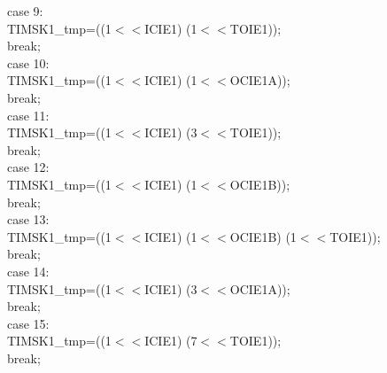 \documentclass[titlepage, a4paper, 10pt, reqno, openany]{report}
\begin{document}
\begin{minipage}[t]{.35\linewidth}
	\hspace*{1cm}		case 9: \\
	\hspace*{1.5cm}			TIMSK1\_tmp=((1$<<$ICIE1) \textbar (1$<<$TOIE1)); \\
	\hspace*{1.5cm}			break; \\
	\hspace*{1cm}		case 10: \\
	\hspace*{1.5cm}			TIMSK1\_tmp=((1$<<$ICIE1) \textbar (1$<<$OCIE1A)); \\
	\hspace*{1.5cm}			break; \\
	\hspace*{1cm}		case 11: \\
	\hspace*{1.5cm}			TIMSK1\_tmp=((1$<<$ICIE1) \textbar (3$<<$TOIE1)); \\
	\hspace*{1.5cm}			break; \\
	\hspace*{1cm}		case 12: \\
	\hspace*{1.5cm}			TIMSK1\_tmp=((1$<<$ICIE1) \textbar (1$<<$OCIE1B)); \\
	\hspace*{1.5cm}			break; \\
	\hspace*{1cm}		case 13: \\
	\hspace*{1.5cm}			TIMSK1\_tmp=((1$<<$ICIE1) \textbar (1$<<$OCIE1B) \textbar (1$<<$TOIE1)); \\
	\hspace*{1.5cm}			break; \\
	\hspace*{1cm}		case 14: \\
	\hspace*{1.5cm}			TIMSK1\_tmp=((1$<<$ICIE1) \textbar (3$<<$OCIE1A)); \\
	\hspace*{1.5cm}			break; \\
	\hspace*{1cm}		case 15: \\
	\hspace*{1.5cm}			TIMSK1\_tmp=((1$<<$ICIE1) \textbar (7$<<$TOIE1)); \\
	\hspace*{1.5cm}			break; \\

\end{minipage}
\end{document}
